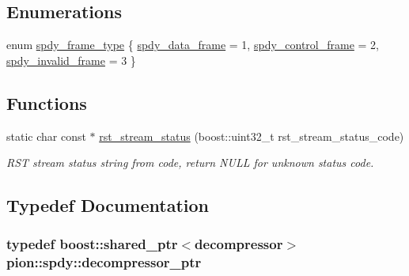 \subsection*{Enumerations}
\begin{DoxyCompactItemize}
\item 
enum \hyperlink{namespacepion_1_1spdy_ae477ffb44271bac96119422b364435ce}{spdy\-\_\-frame\-\_\-type} \{ \hyperlink{namespacepion_1_1spdy_ae477ffb44271bac96119422b364435cea423101817a482a7a03d216a15d9656e5}{spdy\-\_\-data\-\_\-frame} = 1, 
\hyperlink{namespacepion_1_1spdy_ae477ffb44271bac96119422b364435cead0688df35afe5227dfeb2ec6b575412e}{spdy\-\_\-control\-\_\-frame} = 2, 
\hyperlink{namespacepion_1_1spdy_ae477ffb44271bac96119422b364435cea22aeb6dab87b25dd07eabbacc2b236e9}{spdy\-\_\-invalid\-\_\-frame} = 3
 \}
\end{DoxyCompactItemize}
\subsection*{Functions}
\begin{DoxyCompactItemize}
\item 
static char const $\ast$ \hyperlink{namespacepion_1_1spdy_a270398bf30df588e2fce6e17f7619596}{rst\-\_\-stream\-\_\-status} (boost\-::uint32\-\_\-t rst\-\_\-stream\-\_\-status\-\_\-code)
\begin{DoxyCompactList}\small\item\em R\-S\-T stream status string from code, return N\-U\-L\-L for unknown status code. \end{DoxyCompactList}\end{DoxyCompactItemize}


\subsection{Typedef Documentation}
\hypertarget{namespacepion_1_1spdy_ac8512dffc9267ba133bd2c560f07fd1e}{
\subsubsection[{decompressor\-\_\-ptr}]{\setlength{\rightskip}{0pt plus 5cm}typedef boost\-::shared\-\_\-ptr$<${\bf decompressor}$>$ {\bf pion\-::spdy\-::decompressor\-\_\-ptr}}}\label{namespacepion_1_1spdy_ac8512dffc9267ba133bd2c560f07fd1e}


